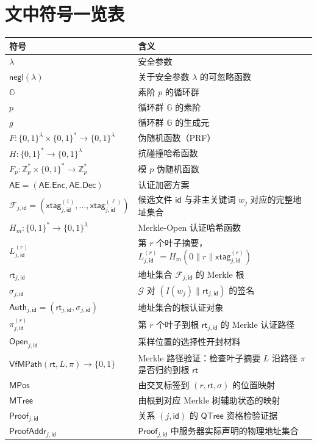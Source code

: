 \chapter{文中符号一览表}\label{app:symbol-list}
\begingroup
\fontsize{10.5pt}{12pt}\selectfont
\renewcommand{\arraystretch}{1.15}
\begin{center}
\begin{tabularx}{0.92\textwidth}{@{}p{}X@{}}
\toprule
符号 & 含义\\
\midrule
$\lambda$ & 安全参数\\
$\mathsf{negl}(\lambda)$ & 关于安全参数 $\lambda$ 的可忽略函数\\
$\mathbb{G}$ & 素阶 $p$ 的循环群\\
$p$ & 循环群 $\mathbb{G}$ 的素阶\\
$g$ & 循环群 $\mathbb{G}$ 的生成元\\
$F:\{0,1\}^\lambda\times\{0,1\}^*\to\{0,1\}^\lambda$ & 伪随机函数（PRF）\\
$H:\{0,1\}^*\to\{0,1\}^\lambda$ & 抗碰撞哈希函数\\
$F_p:\mathbb{Z}_p^*\times\{0,1\}^*\to\mathbb{Z}_p^*$ & 模 $p$ 伪随机函数\\
$\mathsf{AE}=(\mathsf{AE.Enc},\mathsf{AE.Dec})$ & 认证加密方案\\
$\mathcal{F}_{j,\mathsf{id}}=(\mathsf{xtag}_{j,\mathsf{id}}^{(1)},\ldots,\mathsf{xtag}_{j,\mathsf{id}}^{(\ell)})$ & 候选文件 $\mathsf{id}$ 与非主关键词 $w_j$ 对应的完整地址集合\\
$H_m:\{0,1\}^*\to\{0,1\}^{\lambda}$ & Merkle-Open 认证哈希函数\\
$L_{j,\mathsf{id}}^{(r)}$ & 第 $r$ 个叶子摘要，$L_{j,\mathsf{id}}^{(r)}=H_m(0\|r\|\mathsf{xtag}_{j,\mathsf{id}}^{(r)})$\\
$\mathsf{rt}_{j,\mathsf{id}}$ & 地址集合 $\mathcal{F}_{j,\mathsf{id}}$ 的 Merkle 根\\
$\sigma_{j,\mathsf{id}}$ & $\mathcal{G}$ 对 $(I(w_j)\|\mathsf{rt}_{j,\mathsf{id}})$ 的签名\\
$\mathsf{Auth}_{j,\mathsf{id}}=(\mathsf{rt}_{j,\mathsf{id}},\sigma_{j,\mathsf{id}})$ & 地址集合的根认证对象\\
$\pi_{j,\mathsf{id}}^{(r)}$ & 第 $r$ 个叶子到根 $\mathsf{rt}_{j,\mathsf{id}}$ 的 Merkle 认证路径\\
$\mathsf{Open}_{j,\mathsf{id}}$ & 采样位置的选择性开封材料\\
$\mathsf{VfMPath}(\mathsf{rt},L,\pi)\to\{0,1\}$ & Merkle 路径验证：检查叶子摘要 $L$ 沿路径 $\pi$ 是否归约到根 $\mathsf{rt}$\\
$\mathsf{MPos}$ & 由交叉标签到 $(r,\mathsf{rt},\sigma)$ 的位置映射\\
$\mathsf{MTree}$ & 由根到对应 Merkle 树辅助状态的映射\\
$\mathsf{Proof}_{j,\mathsf{id}}$ & 关系 $(j,\mathsf{id})$ 的 $\mathsf{QTree}$ 资格检验证据\\
$\mathsf{ProofAddr}_{j,\mathsf{id}}$ & $\mathsf{Proof}_{j,\mathsf{id}}$ 中服务器实际声明的物理地址集合\\
\bottomrule
\end{tabularx}
\end{center}
\endgroup
